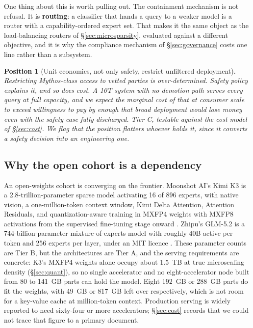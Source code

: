 \documentclass[11pt]{article}
\newtheorem{position}{Position}
\begin{document}
One thing about this is worth pulling out. The containment mechanism is not refusal. It is \textbf{routing}: a classifier that hands a query to a weaker model is a router with a capability-ordered expert set. That makes it the same object as the load-balancing routers of \S\ref{sec:microsparsity}, evaluated against a different objective, and it is why the compliance mechanism of \S\ref{sec:governance} costs one line rather than a subsystem.

\begin{position}[Unit economics, not only safety, restrict unfiltered deployment]
\label{conj:economics}
Restricting Mythos-class access to vetted parties is over-determined. Safety policy explains it, and so does cost. A 10T system with no demotion path serves every query at full capacity, and we expect the marginal cost of that at consumer scale to exceed willingness to pay by enough that broad deployment would lose money even with the safety case fully discharged. Tier C, testable against the cost model of \S\ref{sec:cost}. We flag that the position flatters whoever holds it, since it converts a safety decision into an engineering one.
\end{position}

\subsection{Why the open cohort is a dependency}

An open-weights cohort is converging on the frontier. Moonshot AI's Kimi K3 is a 2.8-trillion-parameter sparse model activating 16 of 896 experts, with native vision, a one-million-token context window, Kimi Delta Attention, Attention Residuals, and quantization-aware training in MXFP4 weights with MXFP8 activations from the supervised fine-tuning stage onward \cite{moonshot2026k3,vllm2026k3}. Zhipu's GLM-5.2 is a 744-billion-parameter mixture-of-experts model with roughly 40B active per token and 256 experts per layer, under an MIT licence \cite{zhipu2026glm52}. These parameter counts are Tier B, but the architectures are Tier A, and the serving requirements are concrete: K3's MXFP4 weights alone occupy about 1.5~TB at true microscaling density (\S\ref{sec:quant}), so no single accelerator and no eight-accelerator node built from 80 to 141~GB parts can hold the model. Eight 192~GB or 288~GB parts do fit the weights, with 49~GB or 817~GB left over respectively, which is not room for a key-value cache at million-token context. Production serving is widely reported to need sixty-four or more accelerators; \S\ref{sec:cost} records that we could not trace that figure to a primary document.
\end{document}
